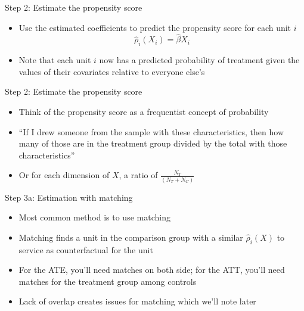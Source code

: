 \documentclass{beamer}
\begin{document}
\begin{frame}{Step 2: Estimate the propensity score}

		\begin{itemize}
		\item Use the estimated coefficients to predict the propensity score for each unit $i$$$\widehat{\rho}_i(X_i) = \widehat{\beta} X_i$$
		\item Note that each unit $i$ now has a predicted probability of treatment given the values of their covariates relative to everyone else's 
		\end{itemize}
\end{frame}



\begin{frame}{Step 2: Estimate the propensity score}

\begin{itemize}
\item Think of the propensity score as a frequentist concept of probability
\item ``If I drew someone from the sample with these characteristics, then how many of those are in the treatment group divided by the total with those characteristics'' 
\item Or for each dimension of $X$, a ratio of $\frac{N_T}{(N_T + N_C)}$

\end{itemize}

\end{frame}





\begin{frame}{Step 3a: Estimation  with matching}

\begin{itemize}
	
	\item Most common method is to use matching
	\item Matching finds a unit in the comparison group with a similar $\widehat{\rho}_i(X)$ to service as counterfactual for the unit
	\item For the ATE, you'll need matches on both side; for the ATT, you'll need matches for the treatment group among controls
	\item Lack of overlap creates issues for matching which we'll note later
	
\end{itemize}

\end{frame}
\end{document}
